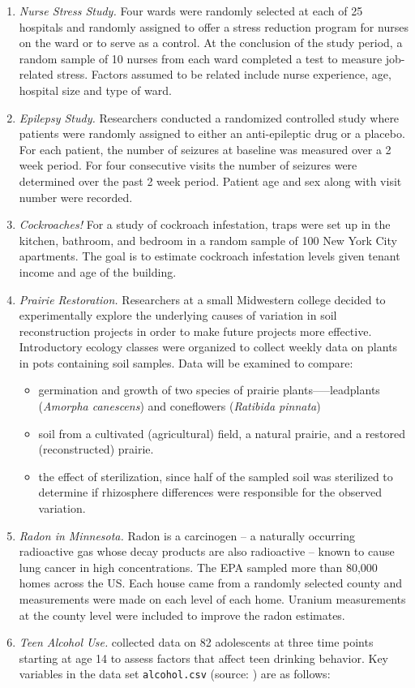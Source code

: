 \documentclass[
]{krantz}
\providecommand{\tightlist}{%
  \setlength{\itemsep}{0pt}\setlength{\parskip}{0pt}}
\begin{document}
\begin{enumerate}
\def\labelenumi{\alph{enumi}.}
\item
  \emph{Nurse Stress Study.} Four wards were randomly selected at each of 25 hospitals and randomly assigned to offer a stress reduction program for nurses on the ward or to serve as a control. At the conclusion of the study period, a random sample of 10 nurses from each ward completed a test to measure job-related stress. Factors assumed to be related include nurse experience, age, hospital size and type of ward.
\item
  \emph{Epilepsy Study.} Researchers conducted a randomized controlled study where patients were randomly assigned to either an anti-epileptic drug or a placebo. For each patient, the number of seizures at baseline was measured over a 2 week period. For four consecutive visits the number of seizures were determined over the past 2 week period. Patient age and sex along with visit number were recorded.
\item
  \emph{Cockroaches!} For a study of cockroach infestation, traps were set up in the kitchen, bathroom, and bedroom in a random sample of 100 New York City apartments. The goal is to estimate cockroach infestation levels given tenant income and age of the building.
\item
  \emph{Prairie Restoration.} Researchers at a small Midwestern college decided to experimentally explore the underlying causes of variation in soil reconstruction projects in order to make future projects more effective. Introductory ecology classes were organized to collect weekly data on plants in pots containing soil samples. Data will be examined to compare:

  \begin{itemize}
  \tightlist
  \item
    germination and growth of two species of prairie plants-----leadplants (\emph{Amorpha canescens}) and coneflowers (\emph{Ratibida pinnata})
  \item
    soil from a cultivated (agricultural) field, a natural prairie, and a restored (reconstructed) prairie.
  \item
    the effect of sterilization, since half of the sampled soil was sterilized to determine if rhizosphere differences were responsible for the observed variation.
  \end{itemize}
\item
  \emph{Radon in Minnesota.} Radon is a carcinogen -- a naturally occurring radioactive gas whose decay products are also radioactive -- known to cause lung cancer in high concentrations. The EPA sampled more than 80,000 homes across the US. Each house came from a randomly selected county and measurements were made on each level of each home. Uranium measurements at the county level were included to improve the radon estimates.
\item
  \emph{Teen Alcohol Use.} \citet{Curran1997} collected data on 82 adolescents at three time points starting at age 14 to assess factors that affect teen drinking behavior. Key variables in the data set \texttt{alcohol.csv} (source: \citet{Singer2003}) are as follows:


\end{enumerate}
\end{document}
